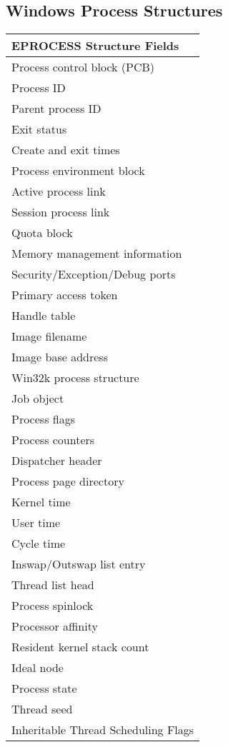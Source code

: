 \documentclass[10pt,conference,draftclsnofoot,onecolumn]{IEEEtran}
\begin{document}
\begin{appendices}

\section{Windows Process Structures}

\begin{tabular}{|l|}
\textbf{EPROCESS Structure Fields}\\
\hline
Process control block (PCB) \\
Process ID \\
Parent process ID \\
Exit status \\
Create and exit times \\
Process environment block \\
Active process link \\
Session process link \\
Quota block \\
Memory management information \\
Security/Exception/Debug ports \\
Primary access token \\
Handle table \\
Image filename \\
Image base address \\
Win32k process structure \\
Job object \\
Process flags \\
Process counters \\
Dispatcher header \\
Process page directory \\
Kernel time \\
User time \\
Cycle time \\
Inswap/Outswap list entry \\
Thread list head \\
Process spinlock \\
Processor affinity \\
Resident kernel stack count \\
Ideal node \\
Process state \\
Thread seed \\
Inheritable Thread Scheduling Flags \\
\end{tabular}


\end{appendices}
\end{document}
